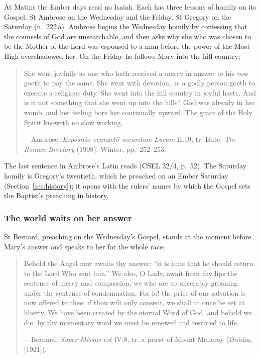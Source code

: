 At Matins the Ember days read no Isaiah. Each has three lessons of homily on its Gospel: St Ambrose
on the Wednesday and the Friday, St Gregory on the Saturday (n.~222\,a). Ambrose begins the
Wednesday homily by confessing that the counsels of God are unsearchable, and then asks why she
who was chosen to be the Mother of the Lord was espoused to a man before the power of the Most
High overshadowed her. On the Friday he follows Mary into the hill country:

\begin{quote}
She went joyfully as one who hath received a mercy in answer to his vow goeth to pay the same. She
went with devotion, as a godly person goeth to execute a religious duty. She went into the hill
country in joyful haste. And is it not something that she went up into the hills? God was already
in her womb, and her feeling bore her continually upward. The grace of the Holy Spirit knoweth no
slow working.\par
{\smallskip\noindent\small ---Ambrose, \textit{Expositio evangelii secundum Lucam} II.19, tr.
Bute, \textit{The Roman Breviary} (1908), Winter, pp.~252--253.\par}
\end{quote}

\noindent The last sentence in Ambrose's Latin reads  (CSEL 32/4, p.~52). The Saturday homily is Gregory's twentieth, which he preached on an
Ember Saturday (Section~\ref{sec:history}); it opens with the rulers' names by which the Gospel
sets the Baptist's preaching in history.

\subsubsection{The world waits on her answer}

St Bernard, preaching on the Wednesday's Gospel, stands at the moment before Mary's answer and
speaks to her for the whole race:

\begin{quote}
Behold the Angel now awaits thy answer: ``it is time that he should return to the Lord Who sent
him.'' We also, O Lady, await from thy lips the sentence of mercy and compassion, we who are so
miserably groaning under the sentence of condemnation. For lo! the price of our salvation is now
offered to thee: if thou wilt only consent, we shall at once be set at liberty. We have been
created by the eternal Word of God, and behold we die: by thy momentary word we must be renewed
and restored to life.\par
{\smallskip\noindent\small ---Bernard, \textit{Super Missus est} IV.8, tr. a priest of Mount
Melleray (Dublin, [1921]).\par}
\end{quote}

